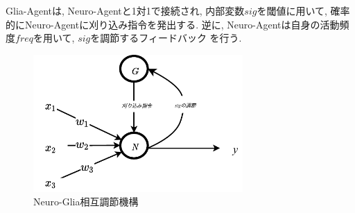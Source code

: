 \documentclass[a4paper,10.5pt,twocolumn]{jsarticle}
\begin{document}
Glia-Agentは, Neuro-Agentと1対1で接続され, 内部変数$sig$を閾値に用いて, 
確率的にNeuro-Agentに刈り込み指令を発出する. 
逆に, Neuro-Agentは自身の活動頻度$freq$を用いて, $sig$を調節するフィードバック
を行う.
\begin{figure}[H]
  \centering
  \includegraphics[width=8cm]{NewNeuroGlia.pdf} 
  \caption{Neuro-Glia相互調節機構} 
\end{figure}
\end{document}
